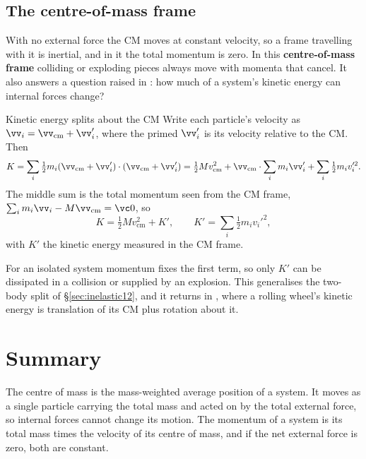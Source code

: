 \begin{figure}[htbp]
\centering
{}
\end{figure}

\subsection{The centre-of-mass frame}\label{sec:cmframe}

With no external force the CM moves at constant velocity, so a frame travelling with it is inertial, and
in it the total momentum is zero. In this \textbf{centre-of-mass frame} colliding or exploding pieces always
move with momenta that cancel. It also answers a question raised in : how much of a
system's kinetic energy can internal forces change?

\begin{derivbox}{Kinetic energy splits about the CM}
Write each particle's velocity as $\vv_i=\vv_{\text{cm}}+\vv_i'$, where the primed $\vv_i'$ is its
velocity relative to the CM. Then
\[
K=\sum_i\tfrac12m_i(\vv_{\text{cm}}+\vv_i')\cdot(\vv_{\text{cm}}+\vv_i')
=\tfrac12Mv_{\text{cm}}^2+\vv_{\text{cm}}\cdot\sum_i m_i\vv_i'+\sum_i\tfrac12m_iv_i'^2 .
\]
The middle sum is the total momentum seen from the CM frame, $\sum_i m_i\vv_i-M\vv_{\text{cm}}=\vc0$, so
\[
\boxed{K=\tfrac12Mv_{\text{cm}}^2+K'},\qquad K'=\sum_i\tfrac12m_iv_i'^2,
\]
with $K'$ the kinetic energy measured in the CM frame.
\end{derivbox}

For an isolated system momentum fixes the first term, so only $K'$ can be dissipated in a collision or
supplied by an explosion. This
generalises the two-body split of \S\ref{sec:inelastic12}, and it returns in , where a
rolling wheel's kinetic energy is translation of its CM plus rotation about it.

\section{Summary}\label{sec:summary13}
The centre of mass is the mass-weighted average position of a system. It moves as a single particle carrying
the total mass and acted on by the total external force, so internal forces cannot change its motion. The
momentum of a system is its total mass times the velocity of its centre of mass, and if the net external force
is zero, both are constant.

